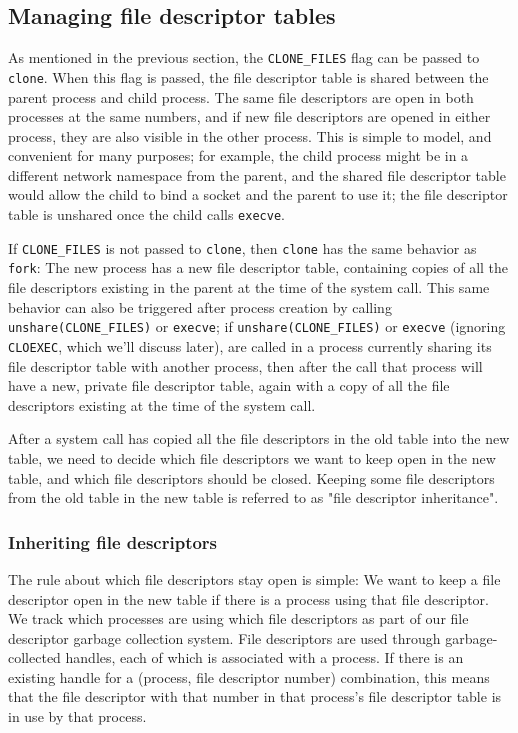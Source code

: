 \documentclass[sigplan]{acmart}
\begin{document}
\subsection{Managing file descriptor tables}\label{fdtables}
As mentioned in the previous section,
the \verb|CLONE_FILES| flag can be passed to \texttt{clone}.
When this flag is passed,
the file descriptor table is shared between the parent process and child process.
The same file descriptors are open in both processes at the same numbers,
and if new file descriptors are opened in either process,
they are also visible in the other process.
This is simple to model,
and convenient for many purposes;
for example, the child process might be in a different network namespace from the parent,
and the shared file descriptor table would allow the child to bind a socket
and the parent to use it;
the file descriptor table is unshared once the child calls \texttt{execve}.

If \verb|CLONE_FILES| is not passed to \texttt{clone},
then \texttt{clone} has the same behavior as \texttt{fork}:
The new process has a new file descriptor table,
containing copies of all the file descriptors existing in the parent at the time of the system call.
This same behavior can also be triggered after process creation by calling \verb|unshare(CLONE_FILES)| or \texttt{execve};
if \verb|unshare(CLONE_FILES)| or \texttt{execve} (ignoring \texttt{CLOEXEC}, which we'll discuss later),
are called in a process currently sharing its file descriptor table with another process,
then after the call that process will have a new, private file descriptor table,
again with a copy of all the file descriptors existing at the time of the system call.

After a system call has copied all the file descriptors in the old table into the new table,
we need to decide which file descriptors we want to keep open in the new table,
and which file descriptors should be closed.
Keeping some file descriptors from the old table in the new table
is referred to as "file descriptor inheritance".
\subsubsection{Inheriting file descriptors}
The rule about which file descriptors stay open is simple:
We want to keep a file descriptor open in the new table
if there is a process using that file descriptor.
We track which processes are using which file descriptors as part of our file descriptor garbage collection system.
File descriptors are used through garbage-collected handles,
each of which is associated with a process.
If there is an existing handle for a (process, file descriptor number) combination,
this means that the file descriptor with that number in that process's file descriptor table is in use by that process.
\end{document}
